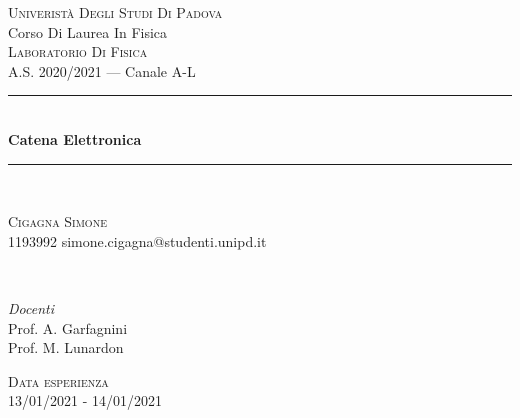 \begin{titlepage}
	\newcommand{\HRule}{\rule{\linewidth}{0.5mm}}
	\center

	\textsc{\LARGE Univeristà Degli Studi Di Padova}\\[1.5cm]
	\Large Corso Di Laurea In Fisica\\[0.5cm]

	\textsc{\large Laboratorio Di Fisica}\\
    A.S. 2020/2021 --- Canale A-L \\[0.5cm]


	\HRule\\[0.4cm]

	{\huge\bfseries Catena Elettronica}\\[0.4cm]

	\HRule\\[1.5cm]


	\begin{minipage}{0.4\textwidth}
		\begin{flushleft}
			\large
			\textsc{Cigagna Simone}\\
			\textsc{1193992}
			simone.cigagna@studenti.unipd.it
		\end{flushleft}
	\end{minipage}
	~
	\begin{minipage}{0.4\textwidth}
		\begin{flushright}
			\large
			\textit{Docenti}\\
			Prof. A. Garfagnini\\
			Prof. M. Lunardon
		\end{flushright}
	\end{minipage}


	\vfill\vfill\vfill %

	{\large \textsc{Data esperienza}\\
  13/01/2021 - 14/01/2021}

\end{titlepage}

\cleardoublepage
